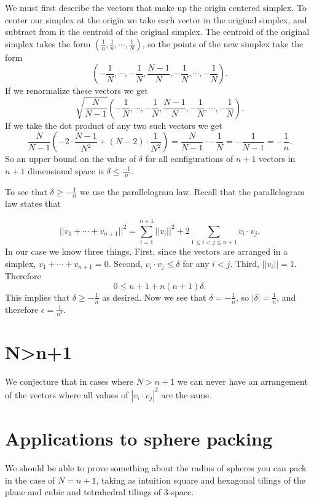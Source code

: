 \documentclass[11pt,letterpaper,twoside,english]{article}
\theoremstyle{theorem}
\theoremstyle{remark}
\begin{document}
We must first describe the vectors that make up the origin centered simplex. To center our simplex at the origin we take each vector in the original simplex, and subtract from it the centroid of the original simplex. The centroid of the original simplex takes the form $(\frac{1}{n},\frac{1}{n},\cdots,\frac{1}{N})$, so the points of the new simplex take the form
$$
\left(-\frac{1}{N},\cdots,-\frac{1}{N},\frac{N-1}{N},-\frac{1}{N},\cdots,-\frac{1}{N}\right).
$$
If we renormalize these vectors we get 
$$
\sqrt{\frac{N}{N-1}}\left(-\frac{1}{N},\cdots,-\frac{1}{N},\frac{N-1}{N},-\frac{1}{N},\cdots,-\frac{1}{N}\right).
$$
If we take the dot product of any two such vectors we get
$$
\frac{N}{N-1}\left(-2\cdot\frac{N-1}{N^2}+(N-2)\cdot\frac{1}{N^2}\right)=\frac{N}{N-1}\cdot-\frac{1}{N}=-\frac{1}{N-1}=-\frac{1}{n}.
$$
So an upper bound on the value of $\delta$ for all configurations of $n+1$ vectors in $n+1$ dimensional space is $\delta\le\frac{-1}{n}$. 

To see that $\delta\ge-\frac{1}{n}$ we use the parallelogram law. Recall that the parallelogram law states that 

$$
||v_1+\cdots+v_{n+1}||^2=\displaystyle\sum_{i=1}^{n+1}||v_i||^2+2\displaystyle\sum_{1\le i<j\le n+1}v_i\cdot v_j.
$$
In our case we know three things. First, since the vectors are arranged in a simplex, $v_1+\cdots+v_{n+1}=0$. Second, $v_i\cdot v_j\le\delta$ for any $i<j$. Third, $||v_i||=1$. Therefore 
$$
0\le n+1+n(n+1)\delta.
$$
This implies that $\delta\ge -\frac{1}{n}$ as desired. Now we see that $\delta=-\frac{1}{n}$, so $|\delta|=\frac{1}{n}$, and therefore $\epsilon=\frac{1}{n^2}$. 

\section{N>n+1}

We conjecture that in cases where $N>n+1$ we can never have an arrangement of the vectors where all values of $|v_i\cdot v_j|^2$ are the same. 

\section{Applications to sphere packing}
We should be able to prove something about the radius of spheres you can pack in the case of $N=n+1$, taking as intuition square and hexagonal tilings of the plane and cubic and tetrahedral tilings of 3-space. 
\end{document}
